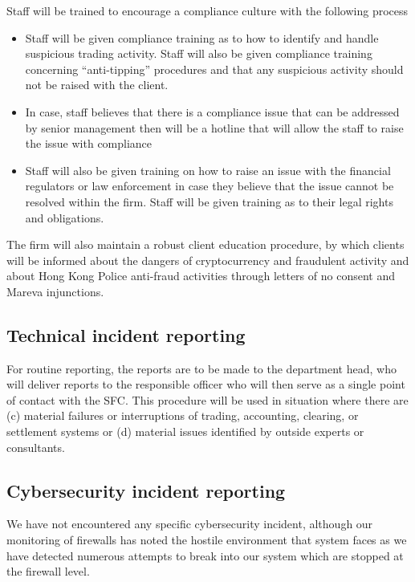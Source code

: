 Staff will be trained to encourage a compliance culture with the
following process
\begin{itemize}
  \item Staff will be given compliance training as to how to identify
    and handle suspicious trading activity.  Staff will also be given
    compliance training concerning ``anti-tipping'' procedures and
    that any suspicious activity should not be raised with the client.
  \item In case, staff believes that there is a compliance issue that
    can be addressed by senior management then will be a hotline that
    will allow the staff to raise the issue with compliance
  \item Staff will also be given training on how to raise an issue
    with the financial regulators or law enforcement in case they
    believe that the issue cannot be resolved within the firm.  Staff
    will be given training as to their legal rights and obligations.
\end{itemize}

The firm will also maintain a robust client education procedure, by
which clients will be informed about the dangers of cryptocurrency and
fraudulent activity and about Hong Kong Police anti-fraud activities
through letters of no consent and Mareva injunctions.

\subsection{Technical incident reporting}

For routine reporting, the reports are to be made to the department
head, who will deliver reports to the responsible officer who will
then serve as a single point of contact with the SFC.  This procedure
will be used in situation where there are (c) material failures or
interruptions of trading, accounting, clearing, or settlement systems
or (d) material issues identified by outside experts or consultants.

\subsection{Cybersecurity incident reporting}

We have not encountered any specific cybersecurity incident, although
our monitoring of firewalls has noted the hostile environment that
system faces as we have detected numerous attempts to break into our
system which are stopped at the firewall level.


